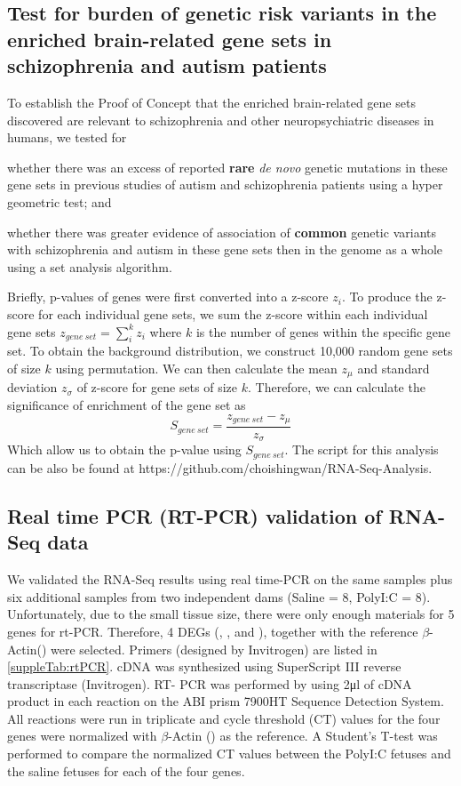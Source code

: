 \subsection{Test for burden of genetic risk variants in the enriched brain-related gene sets in schizophrenia and autism patients }
To establish the Proof of Concept that the enriched brain-related gene sets discovered are relevant to schizophrenia and other neuropsychiatric diseases in humans, we tested for 
\begin{enumerate*}[label=\roman*)]
	\item whether there was an excess of reported \textbf{rare} \textit{de novo} genetic mutations in these gene sets in previous studies of autism and schizophrenia patients\cite{Fromer2014,ORoak2012,Sanders2012,Neale2012} using a hyper geometric test; and
	\item whether there was greater evidence of association of \textbf{common} genetic variants with schizophrenia\cite{Ripke2013} and autism\cite{Anney2010a} in these gene sets then in the genome as a whole using a set analysis algorithm\cite{Ideker2002}. 
\end{enumerate*}
Briefly, p-values of genes were first converted into a z-score $z_i$. 
To produce the z-score for each individual gene sets, we sum the z-score within each individual gene sets $z_{gene\ set} = \sum_i^kz_i$ where $k$ is the number of genes within the specific gene set. 
To obtain the background distribution, we construct 10,000 random gene sets of size $k$ using permutation. 
We can then calculate the mean $z_\mu$ and standard deviation $z_\sigma$ of z-score for gene sets of size $k$.
Therefore, we can calculate the significance of enrichment of the gene set as
$$
S_{gene\ set}=\frac{z_{gene\ set}-z_\mu}{z_\sigma}
$$
Which allow us to obtain the p-value using $S_{gene\ set}$. 
The script for this analysis can be also be found at https://github.com/choishingwan/RNA-Seq-Analysis. 


\subsection{Real time PCR (RT-PCR) validation of RNA-Seq data}
We validated the RNA-Seq results using real time-PCR on the same samples plus six additional samples from two independent dams (Saline = 8, PolyI:C = 8).
Unfortunately, due to the small tissue size, there were only enough materials for 5 genes for rt-PCR. 
Therefore, 4 DEGs (, ,  and ), together with the reference $\beta$-Actin() were selected. 
Primers (designed by Invitrogen) are listed in \ref{suppleTab:rtPCR}. 
cDNA was synthesized using SuperScript III reverse transcriptase (Invitrogen). 
RT- PCR was performed by using 2μl of cDNA product in each reaction on the ABI prism 7900HT Sequence Detection System.
All reactions were run in triplicate and cycle threshold (CT) values for the four genes were normalized with $\beta$-Actin () as the reference. 
A Student’s T-test was performed to compare the normalized CT values between the PolyI:C fetuses and the saline fetuses for each of the four genes\cite{Yuan2006}.


